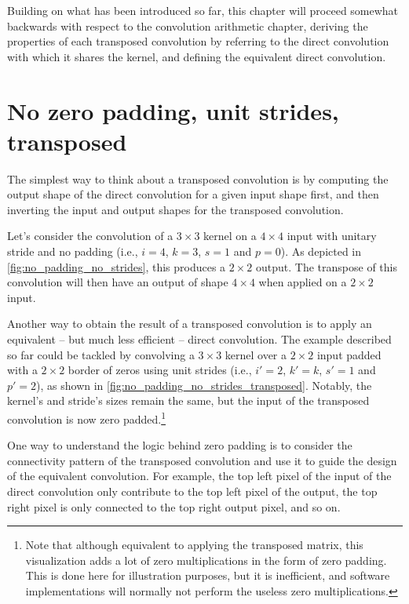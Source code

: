 Building on what has been introduced so far, this chapter will proceed somewhat
backwards with respect to the convolution arithmetic chapter, deriving the
properties of each transposed convolution by referring to the direct
convolution with which it shares the kernel, and defining the equivalent direct
convolution.

\section{No zero padding, unit strides, transposed}

The simplest way to think about a transposed convolution is by computing the
output shape of the direct convolution for a given input shape first, and then
inverting the input and output shapes for the transposed convolution.

Let's consider the convolution of a $3 \times 3$ kernel on a $4 \times 4$
input with unitary stride and no padding (i.e., $i = 4$, $k = 3$, $s = 1$ and
$p = 0$). As depicted in \autoref{fig:no_padding_no_strides}, this produces a
$2 \times 2$ output. The transpose of this convolution will then have an output
of shape $4 \times 4$ when applied on a $2 \times 2$ input.

Another way to obtain the result of a transposed convolution is to apply an
equivalent -- but much less efficient -- direct convolution. The example
described so far could be tackled by convolving a $3 \times 3$ kernel over a
$2 \times 2$ input padded with a $2 \times 2$ border of zeros using unit
strides (i.e., $i' = 2$, $k' = k$, $s' = 1$ and $p' = 2$), as shown in
\autoref{fig:no_padding_no_strides_transposed}. Notably, the kernel's and
stride's sizes remain the same, but the input of the transposed convolution is
now zero padded.\footnote{Note that although
    equivalent to applying the transposed matrix, this visualization adds a lot
    of zero multiplications in the form of zero padding.  This is done here for
    illustration purposes, but it is inefficient, and software implementations
    will normally not perform the useless zero multiplications.}

One way to understand the logic behind zero padding is to consider the
connectivity pattern of the transposed convolution and use it to guide the
design of the equivalent convolution. For example, the top left pixel of the
input of the direct convolution only contribute to the top left pixel of the
output, the top right pixel is only connected to the top right output pixel,
and so on.

